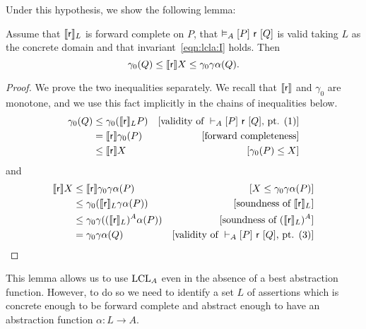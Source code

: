Under this hypothesis, we show the following lemma:

\begin{prop}
	Assume that $\llbracket\mathsf{r}\rrbracket_L$ is forward complete on $P$, that $\vDash_{A}\nobreak[P]~\mathsf{r}~[Q]$ is valid taking $L$ as the concrete domain and that invariant~\eqref{eqn:lcla:I} holds.
	Then 
	\[
	\gamma_0(Q) \le \llbracket\mathsf{r}\rrbracket X \le \gamma_0\gamma\alpha(Q) \text{.}
	\]
\end{prop}
\begin{proof}
	We prove the two inequalities separately. We recall that $\llbracket\mathsf{r}\rrbracket$ and $\gamma_0$ are monotone, and we use this fact implicitly in the chains of inequalities below.
	\begin{align*}
		\gamma_0 (Q) &\le \gamma_0 (\llbracket\mathsf{r}\rrbracket_L P) &[\text{validity of }\vdash_{A}\nobreak[P]~\mathsf{r}~[Q]\text{, pt. (1)}] \\
		&= \llbracket\mathsf{r}\rrbracket \gamma_0(P) &[\text{forward completeness}] \\
		&\le \llbracket\mathsf{r}\rrbracket X &[\gamma_0(P) \le X]
	\end{align*}
	and
	\begin{align*}
		\llbracket\mathsf{r}\rrbracket X &\le \llbracket\mathsf{r}\rrbracket \gamma_0 \gamma \alpha(P) &[X \le \gamma_0 \gamma \alpha(P)] \\
		&\le \gamma_0 (\llbracket\mathsf{r}\rrbracket_L \gamma\alpha(P)) &[\text{soundness of }\llbracket\mathsf{r}\rrbracket_L] \\
		&\le \gamma_0 \gamma ((\llbracket\mathsf{r}\rrbracket_L)^A \alpha(P)) &[\text{soundness of }(\llbracket\mathsf{r}\rrbracket_L)^A] \\
		&= \gamma_0 \gamma \alpha(Q) &[\text{validity of }\vdash_{A}\nobreak[P]~\mathsf{r}~[Q]\text{, pt. (3)}]
	\end{align*}
\end{proof}

This lemma allows us to use $\text{LCL}_A$ even in the absence of a best abstraction function. However, to do so we need to identify a set $L$ of assertions which is concrete enough to be forward complete and abstract enough to have an abstraction function $\alpha: L \rightarrow A$.

